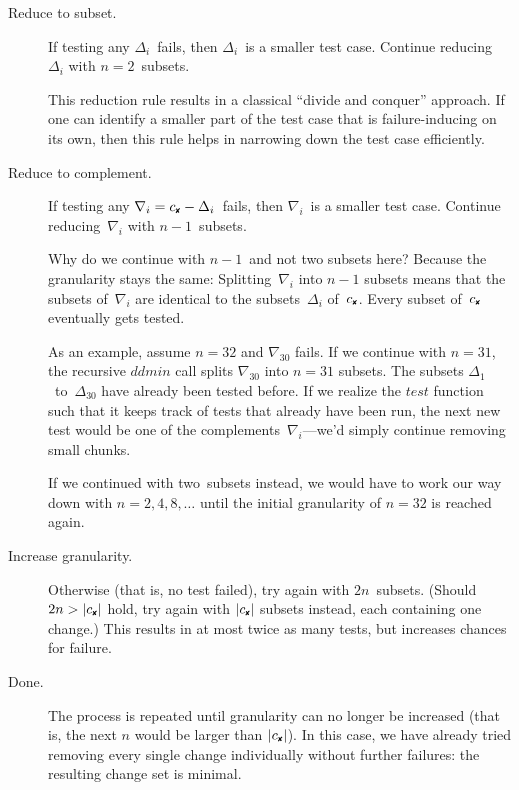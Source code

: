\documentclass{acm_proc_article-sp}
\newcommand{\FAIL}{\text{\ding{56}}\xspace}
\newcommand{\cfail}{{c_{\scriptscriptstyle \FAIL}}}
\newcommand{\test}{\textit{test}\xspace}
\newcommand{\ddmin}{\textit{ddmin}\xspace}
\theoremstyle{plain}
\begin{document}
\begin{description}
\item[Reduce to subset.]  If testing any $\Delta_i$~fails, then $\Delta_i$~is a
  smaller test case.  Continue reducing~$\Delta_i$ with $n = 2$~subsets.
  
  This reduction rule results in a classical ``divide and conquer''
  approach.  If one can identify a smaller part of the test case that
  is failure-inducing on its own, then this rule helps in narrowing
  down the test case efficiently.
  
\item[Reduce to complement.]  If testing any $\nabla_i = \cfail -
  \Delta_i$~fails, then $\nabla_i$~is a smaller test case.  Continue
  reducing~$\nabla_i$ with $n - 1$~subsets.
  
  Why do we continue with $n - 1$~and not two subsets here?  Because
  the granularity stays the same: Splitting~$\nabla_i$ into $n - 1$ subsets
  means that the subsets of~$\nabla_i$ are identical to the subsets~$\Delta_i$
  of~$\cfail$.  Every subset of~$\cfail$ eventually gets tested.
  
  As an example, assume $n = 32$ and $\nabla_{30}$ fails.  If we continue
  with $n = 31$, the recursive $\ddmin$ call splits $\nabla_{30}$ into $n =
  31$ subsets.  The subsets $\Delta_1$~to~$\Delta_{30}$ have already been tested
  before.  If we realize the $\test$ function such that it keeps track
  of tests that already have been run, the next new test would be one
  of the complements~$\nabla_i$---we'd simply continue removing small
  chunks.

  If we continued with two~subsets instead, we would have to work our
  way down with $n = 2, 4, 8, \dots$ until the initial granularity of
  $n = 32$ is reached again.
  
\item[Increase granularity.]  Otherwise (that is, no test failed), try
  again with $2n$~subsets.  (Should $2n > |\cfail|$ hold, try again
  with $|\cfail|$ subsets instead, each containing one change.)  This
  results in at most twice as many tests, but increases chances for
  failure.
  
\item[Done.]  The process is repeated until granularity can no longer
  be increased (that is, the next $n$ would be larger than
  $|\cfail|$).  In this case, we have already tried removing every
  single change individually without further failures: the resulting
  change set is minimal.
\end{description}
\end{document}
